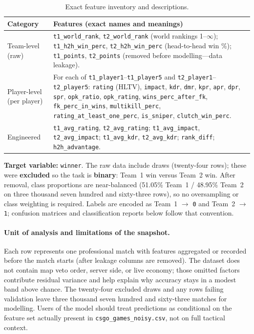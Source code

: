 \documentclass[12pt,a4paper]{article}
\begin{document}
\begin{table}[H]
\centering
\caption{Exact feature inventory and descriptions.}
\label{tab:features_overview}
\begin{tabularx}{\textwidth}{lX}
\toprule
\textbf{Category} & \textbf{Features (exact names and meanings)} \\
\midrule
Team-level (raw) & \texttt{t1\_world\_rank}, \texttt{t2\_world\_rank} (world rankings 1--$\infty$); \texttt{t1\_h2h\_win\_perc}, \texttt{t2\_h2h\_win\_perc} (head-to-head win \%); \texttt{t1\_points}, \texttt{t2\_points} (removed before modelling---data leakage). \\
\midrule
Player-level (per player) & For each of \texttt{t1\_player1}--\texttt{t1\_player5} and \texttt{t2\_player1}--\texttt{t2\_player5}: \texttt{rating} (HLTV), \texttt{impact}, \texttt{kdr}, \texttt{dmr}, \texttt{kpr}, \texttt{apr}, \texttt{dpr}, \texttt{spr}, \texttt{opk\_ratio}, \texttt{opk\_rating}, \texttt{wins\_perc\_after\_fk}, \texttt{fk\_perc\_in\_wins}, \texttt{multikill\_perc}, \texttt{rating\_at\_least\_one\_perc}, \texttt{is\_sniper}, \texttt{clutch\_win\_perc}. \\
\midrule
Engineered & \texttt{t1\_avg\_rating}, \texttt{t2\_avg\_rating}; \texttt{t1\_avg\_impact}, \texttt{t2\_avg\_impact}; \texttt{t1\_avg\_kdr}, \texttt{t2\_avg\_kdr}; \texttt{rank\_diff}; \texttt{h2h\_advantage}. \\
\bottomrule
\end{tabularx}
\end{table}

\textbf{Target variable:} \texttt{winner}. The raw data include draws (twenty-four rows); these were \textbf{excluded} so the task is \textbf{binary}: Team~1 win versus Team~2 win. After removal, class proportions are near-balanced (51.05\% Team~1 / 48.95\% Team~2 on three thousand seven hundred and sixty-three rows), so no oversampling or class weighting is required. Labels are encoded as Team~1 $\rightarrow$ \texttt{0} and Team~2 $\rightarrow$ \texttt{1}; confusion matrices and classification reports below follow that convention.

\paragraph{Unit of analysis and limitations of the snapshot.}
Each row represents one professional match with features aggregated or recorded before the match starts (after leakage columns are removed). The dataset does not contain map veto order, server side, or live economy; those omitted factors contribute residual variance and help explain why accuracy stays in a modest band above chance. The twenty-four excluded draws and any rows failing validation leave three thousand seven hundred and sixty-three matches for modelling. Users of the model should treat predictions as conditional on the feature set actually present in \texttt{csgo\_games\_noisy.csv}, not on full tactical context.
\end{document}
